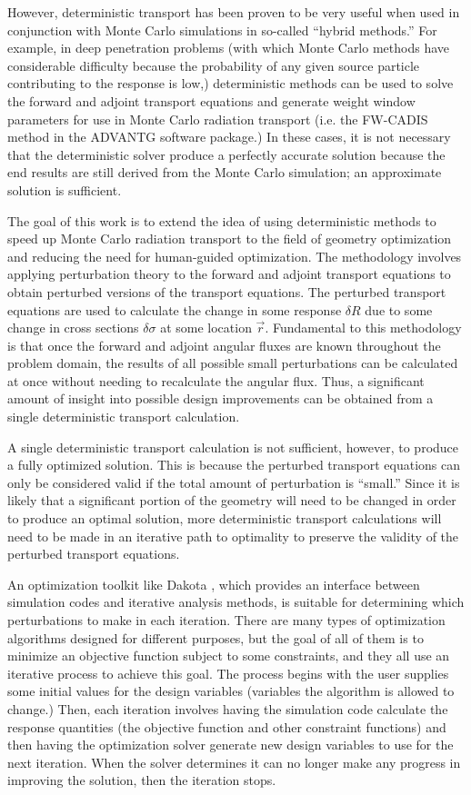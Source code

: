 However, deterministic transport has been proven to be very useful when used in conjunction with Monte Carlo simulations in so-called ``hybrid methods.''
For example, in deep penetration problems (with which Monte Carlo methods have considerable difficulty because the probability of any given source particle contributing to the response is low,) deterministic methods can be used to solve the forward and adjoint transport equations and generate weight window parameters for use in Monte Carlo radiation transport (i.e. the FW-CADIS method \cite{fwcadis} in the ADVANTG \cite{advantg} software package.)
In these cases, it is not necessary that the deterministic solver produce a perfectly accurate solution because the end results are still derived from the Monte Carlo simulation; an approximate solution is sufficient.

The goal of this work is to extend the idea of using deterministic methods to speed up Monte Carlo radiation transport to the field of geometry optimization and reducing the need for human-guided optimization.
The methodology involves applying perturbation theory to the forward and adjoint transport equations to obtain perturbed versions of the transport equations.
The perturbed transport equations are used to calculate the change in some response $\delta R$ due to some change in cross sections $\delta\sigma$ at some location $\vec{r}$.
Fundamental to this methodology is that once the forward and adjoint angular fluxes are known throughout the problem domain, the results of all possible small perturbations can be calculated at once without needing to recalculate the angular flux.
Thus, a significant amount of insight into possible design improvements can be obtained from a single deterministic transport calculation.

A single deterministic transport calculation is not sufficient, however, to produce a fully optimized solution.
This is because the perturbed transport equations can only be considered valid if the total amount of perturbation is ``small.''
Since it is likely that a significant portion of the geometry will need to be changed in order to produce an optimal solution, more deterministic transport calculations will need to be made in an iterative path to optimality to preserve the validity of the perturbed transport equations.

An optimization toolkit like Dakota \cite{dakota}, which provides an interface between simulation codes and iterative analysis methods, is suitable for determining which perturbations to make in each iteration.
There are many types of optimization algorithms designed for different purposes, but the goal of all of them is to minimize an objective function subject to some constraints, and they all use an iterative process to achieve this goal.
The process begins with the user supplies some initial values for the design variables (variables the algorithm is allowed to change.)
Then, each iteration involves having the simulation code calculate the response quantities (the objective function and other constraint functions) and then having the optimization solver generate new design variables to use for the next iteration.
When the solver determines it can no longer make any progress in improving the solution, then the iteration stops.

